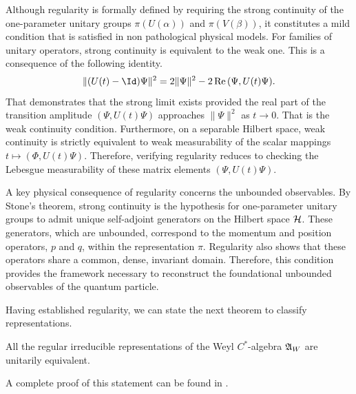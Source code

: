 	\begin{remark}
		\label{rem:regularity-consequences}
		Although regularity is formally defined by requiring the strong continuity of the one-parameter unitary groups $\pi(U(\alpha))$ and $\pi(V(\beta))$, it constitutes a mild condition that is satisfied in non pathological physical models. For families of unitary operators, strong continuity is equivalent to the weak one. This is a consequence of the following identity.
		\begin{equation}
			\|(U(t)-\Id)\Psi\|^2 = 2\|\Psi\|^2 - 2\,\mathrm{Re}\,(\Psi,U(t)\Psi).
		\end{equation}
		That demonstrates that the strong limit exists provided the real part of the transition amplitude $(\Psi,U(t)\Psi)$ approaches $\|\Psi\|^2$ as $t \to 0$. That is the weak continuity condition. Furthermore, on a separable Hilbert space, weak continuity is strictly equivalent to weak measurability of the scalar mappings $t \mapsto (\Phi,U(t)\Psi)$. Therefore, verifying regularity reduces to checking the Lebesgue measurability of these matrix elements $(\Psi,U(t)\Psi)$.
	\end{remark}
	
	A key physical consequence of regularity concerns the unbounded observables. By Stone's theorem, strong continuity is the hypothesis for one-parameter unitary groups to admit unique self-adjoint generators on the Hilbert space $\H$. These generators, which are unbounded, correspond to the momentum and position operators, $p$ and $q$, within the representation $\pi$. Regularity also shows that these operators share a common, dense, invariant domain. Therefore, this condition provides the framework necessary to reconstruct the foundational unbounded observables of the quantum particle.
	
	\vspace{0.4cm}
	
	\noindent Having established regularity, we can state the next theorem to classify representations.
	
	\begin{theorem}
		\label{thm:von-neumann-uniqueness}
		All the regular irreducible representations of the Weyl $C^*$-algebra $\mathfrak{A}_W$ are unitarily equivalent.
	\end{theorem}
	\noindent A complete proof of this statement can be found in \cite[Theorem 3.2.2]{strocchiIntroductionMathematicalStructure2005}.
	
